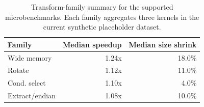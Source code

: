 \begin{table}[t]
  \centering
  \caption{Transform-family summary for the supported microbenchmarks. Each family aggregates three kernels in the current synthetic placeholder dataset. }
  \label{tab:rq1-family-summary}
  \small
  \begin{tabular}{lrr}
    \toprule
    Family & Median speedup & Median size shrink \\
    \midrule
    Wide memory & 1.24x & 18.0\% \\
    Rotate & 1.12x & 11.0\% \\
    Cond. select & 1.10x & 4.0\% \\
    Extract/endian & 1.08x & 10.0\% \\
    \bottomrule
  \end{tabular}
\end{table}
